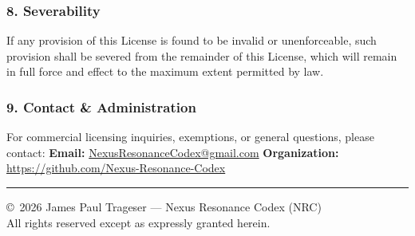 \documentclass[11pt,a4paper,oneside]{article}
\begin{document}
	\subsubsection*{8. Severability}
	If any provision of this License is found to be invalid or unenforceable, such provision shall be severed from the remainder of this License, which will remain in full force and effect to the maximum extent permitted by law.

	\subsubsection*{9. Contact \& Administration}
	For commercial licensing inquiries, exemptions, or general questions, please contact:
	\textbf{Email:} \href{mailto:NexusResonanceCodex@gmail.com}{NexusResonanceCodex@gmail.com}
	\textbf{Organization:} \url{https://github.com/Nexus-Resonance-Codex}

	\vspace{1em}
	\hrule
	\vspace{0.5em}
	\noindent \copyright\ 2026 James Paul Trageser --- Nexus Resonance Codex (NRC) \\
	All rights reserved except as expressly granted herein.

	
\end{document}
